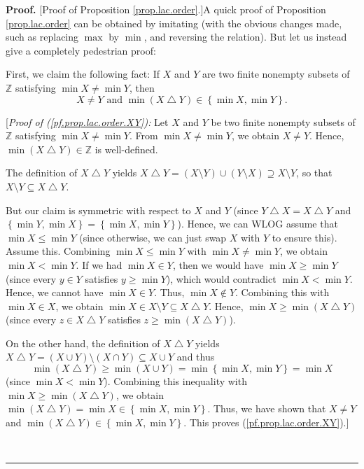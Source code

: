 \documentclass[numbers=enddot,12pt,final,onecolumn,notitlepage]{scrartcl}%
\theoremstyle{definition}
\newenvironment{proof}[1][Proof]{\noindent\textbf{#1.} }{\ \rule{0.5em}{0.5em}}
\newenvironment{verlong}{}{}
\begin{document}
\begin{verlong}


\begin{proof}
[Proof of Proposition \ref{prop.lac.order}.]A quick proof of Proposition
\ref{prop.lac.order} can be obtained by imitating \cite[proof of Lemma
4.3]{ABN-peaks} (with the obvious changes made, such as replacing $\max$ by
$\min$, and reversing the relation).
But let us instead give a completely pedestrian proof:

First, we claim the following fact: If $X$ and $Y$ are two finite nonempty
subsets of $\mathbb{Z}$ satisfying $\min X\neq\min Y$, then%
\begin{equation}
X\neq Y\text{ and }\min\left(  X\bigtriangleup Y\right)  \in\left\{  \min
X,\min Y\right\}  . \label{pf.prop.lac.order.XY}%
\end{equation}


[\textit{Proof of (\ref{pf.prop.lac.order.XY}):} Let $X$ and $Y$ be two finite
nonempty subsets of $\mathbb{Z}$ satisfying $\min X\neq\min Y$. From $\min
X\neq\min Y$, we obtain $X\neq Y$. Hence, $\min\left(  X\bigtriangleup
Y\right)  \in\mathbb{Z}$ is well-defined.

The definition of $X\bigtriangleup Y$ yields $X\bigtriangleup Y=\left(
X\setminus Y\right)  \cup\left(  Y\setminus X\right)  \supseteq X\setminus Y$,
so that $X\setminus Y\subseteq X\bigtriangleup Y$.

But our claim is symmetric with respect to $X$ and $Y$ (since $Y\bigtriangleup
X=X\bigtriangleup Y$ and $\left\{  \min Y,\min X\right\}  =\left\{  \min
X,\min Y\right\}  $). Hence, we can WLOG assume that $\min X\leq\min Y$ (since
otherwise, we can just swap $X$ with $Y$ to ensure this). Assume this.
Combining $\min X\leq\min Y$ with $\min X\neq\min Y$, we obtain $\min X<\min
Y$. If we had $\min X\in Y$, then we would have $\min X\geq\min Y$ (since
every $y\in Y$ satisfies $y\geq\min Y$), which would contradict $\min X<\min
Y$. Hence, we cannot have $\min X\in Y$. Thus, $\min X\notin Y$. Combining
this with $\min X\in X$, we obtain $\min X\in X\setminus Y\subseteq
X\bigtriangleup Y$. Hence, $\min X\geq\min\left(  X\bigtriangleup Y\right)  $
(since every $z\in X\bigtriangleup Y$ satisfies $z\geq\min\left(
X\bigtriangleup Y\right)  $).

On the other hand, the definition of $X\bigtriangleup Y$ yields
$X\bigtriangleup Y=\left(  X\cup Y\right)  \setminus\left(  X\cap Y\right)
\subseteq X\cup Y$ and thus%
\[
\min\left(  X\bigtriangleup Y\right)  \geq\min\left(  X\cup Y\right)
=\min\left\{  \min X,\min Y\right\}  =\min X
\]
(since $\min X<\min Y$).
Combining this inequality with $\min X\geq\min\left(  X\bigtriangleup
Y\right)  $, we obtain $\min\left(  X\bigtriangleup Y\right)  =\min
X\in\left\{  \min X,\min Y\right\}  $. Thus, we have shown that $X\neq Y$ and
$\min\left(  X\bigtriangleup Y\right)  \in\left\{  \min X,\min Y\right\}  $.
This proves (\ref{pf.prop.lac.order.XY}).]


\end{proof}
\end{verlong}
\end{document}
